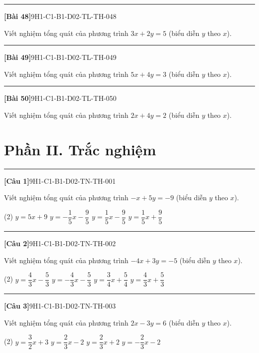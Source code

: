 \documentclass[12pt,a4paper]{article}
\newif\ifloigiai
\newenvironment{cauhoi}[2]{%
  \par\medskip\noindent\rule{\textwidth}{0.4pt}\par\nopagebreak
  \noindent\textbf{[#1]}\hfill{\scriptsize\ttfamily #2}\par\nopagebreak\smallskip}{\par}
\newcommand{\loigiai}[1]{\ifloigiai\par\smallskip\noindent\textit{Lời giải.} #1\par\fi}
\newcommand{\dapan}[1]{\ifloigiai\par\smallskip\noindent\textit{Đáp án:} \textbf{#1}\par\fi}
\begin{document}
\begin{cauhoi}{Bài 48}{9H1-C1-B1-D02-TL-TH-048}
Viết nghiệm tổng quát của phương trình $3x+2y=5$ (biểu diễn $y$ theo $x$).
\loigiai{Ta có $2y=5-3x$ nên $y=-\dfrac{3}{2}x+\dfrac{5}{2}$. Nghiệm tổng quát là $(x;\,-\dfrac{3}{2}x+\dfrac{5}{2})$ với $x\in\mathbb R$.}
\end{cauhoi}
\begin{cauhoi}{Bài 49}{9H1-C1-B1-D02-TL-TH-049}
Viết nghiệm tổng quát của phương trình $5x+4y=3$ (biểu diễn $y$ theo $x$).
\loigiai{Ta có $4y=3-5x$ nên $y=-\dfrac{5}{4}x+\dfrac{3}{4}$. Nghiệm tổng quát là $(x;\,-\dfrac{5}{4}x+\dfrac{3}{4})$ với $x\in\mathbb R$.}
\end{cauhoi}
\begin{cauhoi}{Bài 50}{9H1-C1-B1-D02-TL-TH-050}
Viết nghiệm tổng quát của phương trình $2x+4y=2$ (biểu diễn $y$ theo $x$).
\loigiai{Ta có $4y=2-2x$ nên $y=-\dfrac{1}{2}x+\dfrac{1}{2}$. Nghiệm tổng quát là $(x;\,-\dfrac{1}{2}x+\dfrac{1}{2})$ với $x\in\mathbb R$.}
\end{cauhoi}
\clearpage\section*{Phần II. Trắc nghiệm}
\begin{cauhoi}{Câu 1}{9H1-C1-B1-D02-TN-TH-001}
Viết nghiệm tổng quát của phương trình $-x+5y=-9$ (biểu diễn $y$ theo $x$).
\begin{tasks}(2)
\task $y=5x+9$
\task $y=-\dfrac{1}{5}x-\dfrac{9}{5}$
\task $y=\dfrac{1}{5}x-\dfrac{9}{5}$
\task $y=\dfrac{1}{5}x+\dfrac{9}{5}$
\end{tasks}
\dapan{C}
\end{cauhoi}
\begin{cauhoi}{Câu 2}{9H1-C1-B1-D02-TN-TH-002}
Viết nghiệm tổng quát của phương trình $-4x+3y=-5$ (biểu diễn $y$ theo $x$).
\begin{tasks}(2)
\task $y=\dfrac{4}{3}x-\dfrac{5}{3}$
\task $y=-\dfrac{4}{3}x-\dfrac{5}{3}$
\task $y=\dfrac{3}{4}x+\dfrac{5}{4}$
\task $y=\dfrac{4}{3}x+\dfrac{5}{3}$
\end{tasks}
\dapan{A}
\end{cauhoi}
\begin{cauhoi}{Câu 3}{9H1-C1-B1-D02-TN-TH-003}
Viết nghiệm tổng quát của phương trình $2x-3y=6$ (biểu diễn $y$ theo $x$).
\begin{tasks}(2)
\task $y=\dfrac{3}{2}x+3$
\task $y=\dfrac{2}{3}x-2$
\task $y=\dfrac{2}{3}x+2$
\task $y=-\dfrac{2}{3}x-2$
\end{tasks}
\dapan{B}
\end{cauhoi}
\end{document}

